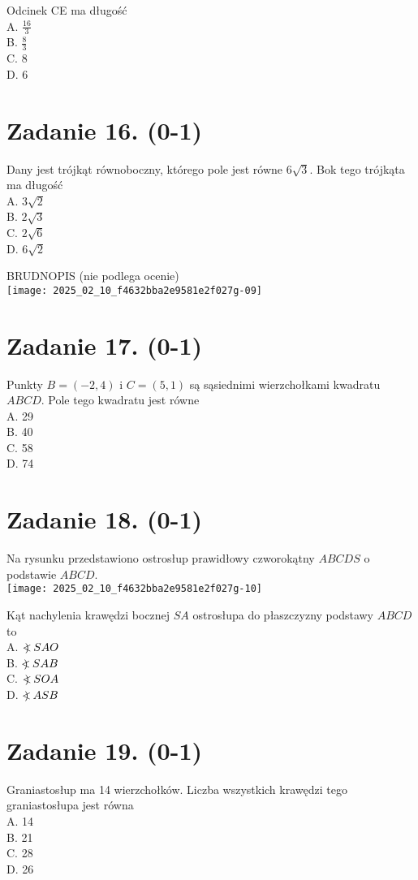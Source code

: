 \documentclass[10pt]{article}
\newcommand\Varangle{\mathop{{<\!\!\!\!\!\text{\small)}}\:}\nolimits}
\begin{document}
Odcinek CE ma długość\\
A. \(\frac{16}{3}\)\\
B. \(\frac{8}{3}\)\\
C. 8\\
D. 6

\section*{Zadanie 16. (0-1)}
Dany jest trójkąt równoboczny, którego pole jest równe \(6 \sqrt{3}\). Bok tego trójkąta ma długość\\
A. \(3 \sqrt{2}\)\\
B. \(2 \sqrt{3}\)\\
C. \(2 \sqrt{6}\)\\
D. \(6 \sqrt{2}\)

BRUDNOPIS (nie podlega ocenie)\\
\texttt{[image: 2025\_02\_10\_f4632bba2e9581e2f027g-09]}

\section*{Zadanie 17. (0-1)}
Punkty \(B=(-2,4)\) i \(C=(5,1)\) są sąsiednimi wierzchołkami kwadratu \(A B C D\). Pole tego kwadratu jest równe\\
A. 29\\
B. 40\\
C. 58\\
D. 74

\section*{Zadanie 18. (0-1)}
Na rysunku przedstawiono ostrosłup prawidłowy czworokątny \(A B C D S\) o podstawie \(A B C D\).\\
\texttt{[image: 2025\_02\_10\_f4632bba2e9581e2f027g-10]}

Kąt nachylenia krawędzi bocznej \(S A\) ostrosłupa do płaszczyzny podstawy \(A B C D\) to\\
A. \(\Varangle S A O\)\\
B. \(\Varangle S A B\)\\
C. \(\Varangle S O A\)\\
D. \(\Varangle A S B\)

\section*{Zadanie 19. (0-1)}
Graniastosłup ma 14 wierzchołków. Liczba wszystkich krawędzi tego graniastosłupa jest równa\\
A. 14\\
B. 21\\
C. 28\\
D. 26
\end{document}
